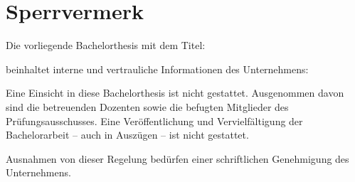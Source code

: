 \chapter*{Sperrvermerk}
\vspace*{0.7cm}

Die vorliegende Bachelorthesis mit dem Titel:
\vspace*{0.7cm}

\titel


\vspace*{0.7cm}
beinhaltet interne und vertrauliche Informationen des Unternehmens:
\vspace*{0.7cm}

\institutioneins

\vspace*{0.7cm}
Eine Einsicht in diese Bachelorthesis ist nicht gestattet. Ausgenommen davon sind die betreuenden Dozenten sowie die befugten Mitglieder des Prüfungsausschusses. Eine Veröffentlichung und Vervielfältigung der Bachelorarbeit – auch in Auszügen – ist nicht gestattet.

\vspace*{0.7cm}

Ausnahmen von dieser Regelung bedürfen einer schriftlichen Genehmigung des Unternehmens.

\clearpage
\rohead{\textnormal{\headmark}}
